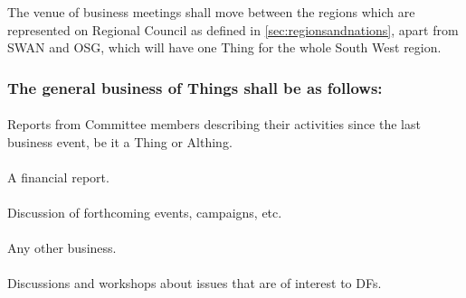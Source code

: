 \documentclass[a4paper, 12pt]{report}
\begin{document}
\subsubsection{}
The venue of business meetings shall move between the regions which are represented on Regional Council as defined in \ref{sec:regionsandnations}, apart from SWAN and OSG, which will have one Thing for the whole South West region.
\subsubsection{The general business of Things shall be as follows:}
\paragraph{}
Reports from Committee members describing their activities since the last business event, be it a Thing or Althing.
\paragraph{}
A financial report.
\paragraph{}
Discussion of forthcoming events, campaigns, etc. 
\paragraph{}
Any other business.
\paragraph{}
Discussions and workshops about issues that are of interest to DFs. 
\end{document}
